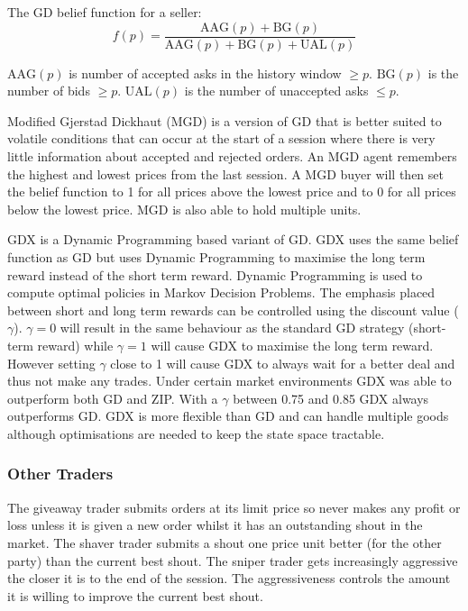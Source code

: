 \documentclass[preprint]{acm_proc_article-sp} %
\begin{document}
The GD belief function for a seller:
\begin{equation}
  f(p) = \frac{\text{AAG}(p) + \text{BG}(p)}{\text{AAG}(p) + \text{BG}(p) +
  \text{UAL}(p)}
\end{equation}

$\text{AAG}(p)$ is number of accepted asks in the history window $\geq p$.
$\text{BG}(p)$ is
the number of bids $\geq p$. $\text{UAL}(p)$ is the number of unaccepted asks $\leq p$.

Modified Gjerstad Dickhaut (MGD)\cite{mgd} is a version of GD that
is better suited to volatile conditions that can occur at the start of a
session where there is very little information about accepted and rejected
orders.
An MGD agent remembers the highest and lowest prices from the last session.
A MGD buyer will then set the belief function to 1 for all prices above the
lowest price and to 0 for all prices below the lowest price.
MGD is also able to hold multiple units.

GDX\cite{gdx} is a Dynamic Programming based variant of GD.
GDX uses the same belief function as GD but uses Dynamic Programming to
maximise the long term reward instead of the short term reward.
Dynamic Programming is used to compute optimal policies in Markov Decision
Problems.
The emphasis placed between short and long term rewards can be controlled using
the discount value ($\gamma$).
$\gamma = 0$ will result in the same behaviour as the standard GD strategy
(short-term reward) while $\gamma = 1$ will cause GDX to maximise the long term
reward.
However setting $\gamma$ close to 1 will cause GDX to always wait for a better
deal and thus not make any trades.
Under certain market environments GDX was able to outperform
both GD and ZIP.
With a $\gamma$ between 0.75 and 0.85 GDX always outperforms GD.
GDX is more flexible than GD and can handle multiple goods although
optimisations are needed to keep the state space tractable.\\


\subsubsection{Other Traders}
The giveaway trader submits orders at its limit price so never makes any profit
or loss unless it is given a new order whilst it has an outstanding shout in
the market. The shaver trader submits a shout one price unit better (for the
other party) than the current best shout. The sniper trader gets increasingly
aggressive the closer it is to the end of the session. The aggressiveness
controls the amount it is willing to improve the current best shout.\\
\end{document}
